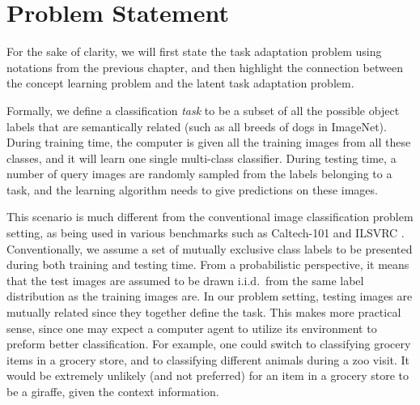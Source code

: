 
\section{Problem Statement}\label{sec:adaptation:model}
For the sake of clarity, we will first state the task adaptation problem using notations from the previous chapter, and then highlight the connection between the concept learning problem and the latent task adaptation problem.

Formally, we define a classification \emph{task} to be a subset of all the possible object labels that are semantically related (such as all breeds of dogs in ImageNet). During training time, the computer is given all the training images from all these classes, and it will learn one single multi-class classifier. During testing time, a number of query images are randomly sampled from the labels belonging to a task, and the learning algorithm needs to give predictions on these images.

This scenario is much different from the conventional image classification problem setting, as being used in various benchmarks such as Caltech-101 \cite{fei2006one} and ILSVRC \cite{ilsvrc}. Conventionally, we assume a set of mutually exclusive class labels to be presented during both training and testing time. From a probabilistic perspective, it means that the test images are assumed to be drawn i.i.d.\ from the same label distribution as the training images are. In our problem setting, testing images are mutually related since they together define the task. This makes more practical sense, since one may expect a computer agent to utilize its environment to preform better classification. For example, one could switch to classifying grocery items in a grocery store, and to classifying different animals during a zoo visit. It would be extremely unlikely (and not preferred) for an item in a grocery store to be a giraffe, given the context information.

